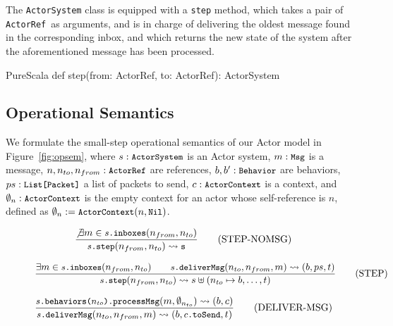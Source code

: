 \documentclass[a4paper,twoside]{article}
\newcommand{\InlineS}[1]{\lstinline[language=PureScala,basicstyle=\small\ttfamily,columns=fixed]|#1|}
\newcommand{\RefFig}[1]{Figure~\ref{#1}}
\newcommand{\ActorRef}{\InlineS{ActorRef}\ }
\newcommand{\stt}[1]{\texttt{\small{#1}}}
\begin{document}
\begin{enumerate}
The \InlineS{ActorSystem} class is equipped with a \InlineS{step} method, which takes 
a pair of \ActorRef as arguments, and is in charge of delivering the oldest message 
found in the corresponding inbox, and which returns the new state of the system after 
the aforementioned message has been processed.

\begin{ShortCode}{PureScala}
def step(from: ActorRef, to: ActorRef): ActorSystem
\end{ShortCode}

\subsection{Operational Semantics}
\label{semantics}

We formulate the small-step operational semantics of our Actor model in 
\RefFig{fig:opsem}, where $s: \stt{ActorSystem}$ is an Actor system,
$m: \stt{Msg}$ is a message,
$n, n_{to}, n_{from}: \stt{ActorRef}$ are references,
$b, b': \stt{Behavior}$ are behaviors,
$ps: \stt{List[Packet]}$ a list of packets to send,
$c: \stt{ActorContext}$ is a context,
and $\emptyset_n: \stt{ActorContext}$ is the empty context for an actor whose
self-reference is $n$, defined as $\emptyset_n := \stt{ActorContext}(n, \stt{Nil})$.

\begin{figure}[!h]
\begin{framed}
 
\begin{equation}
\dfrac{
  \not\exists m \in \stt{$s$.inboxes}(n_{from}, n_{to})
}{
  \stt{$s$.step}(n_{from}, n_{to}) \leadsto \stt{s}
}
\tag{STEP-NOMSG}
\end{equation}

\vspace{10pt}
\begin{equation}
\dfrac{
  \exists m \in \stt{$s$.inboxes}(n_{from}, n_{to}) \qquad
  \stt{$s$.deliverMsg}(n_{to}, n_{from}, m) \leadsto (b, ps, t)
}{
  \stt{$s$.step}(n_{from}, n_{to}) \leadsto s \uplus (n_{to} \mapsto b, \ldots, t)
}
\tag{STEP}
\end{equation}

\vspace{10pt}
\begin{equation}
\dfrac{
  \stt{$s$.behaviors($n_{to}$).processMsg}(m, \emptyset_{n_{to}}) \leadsto (b, c) 
}{
  \stt{$s$.deliverMsg}(n_{to}, n_{from}, m) \leadsto (b, \stt{$c$.toSend}, t)
}
\tag{DELIVER-MSG}
\end{equation}


\end{framed}
\end{figure}
\end{enumerate}
\end{document}
